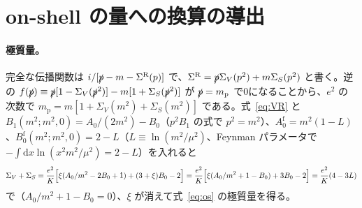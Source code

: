 \documentclass[a4paper,10pt]{ltjsarticle}
\newcommand{\dd}{\mathrm{d}}
\begin{document}
\section{on-shell の量への換算の導出}\label{app:os}

\paragraph{極質量。}完全な伝播関数は $i/[\slashed p-m-\Sigma^{\mathrm R}(p)]$ で、$\Sigma^{\mathrm R}=\slashed p\Sigma_V(p^2)+m\Sigma_S(p^2)$ と書く。逆の $f(\slashed p)\equiv\slashed p[1-\Sigma_V(\slashed p^2)]-m[1+\Sigma_S(\slashed p^2)]$ が $\slashed p=m_{\mathrm p}$ で0になることから、$e^2$ の次数で $m_{\mathrm p}=m[1+\Sigma_V(m^2)+\Sigma_S(m^2)]$ である。式~\eqref{eq:VR} と $B_1(m^2;m^2,0)=A_0/(2m^2)-B_0$（$p^2B_1$ の式で $p^2=m^2$）、$A_0^{\mathrm f}=m^2(1-L)$、$B_0^{\mathrm f}(m^2;m^2,0)=2-L$（$L\equiv\ln(m^2/\mu^2)$、Feynman パラメータで $-\int\dd x\ln(x^2m^2/\mu^2)=2-L$）を入れると
\begin{equation*}
\Sigma_V+\Sigma_S=\frac{e^2}{K}\Bigl[\xi(A_0/m^2-2B_0+1)+(3+\xi)B_0-2\Bigr]
=\frac{e^2}{K}\Bigl[\xi(A_0/m^2+1-B_0)+3B_0-2\Bigr]=\frac{e^2}{K}(4-3L)
\end{equation*}
で（$A_0/m^2+1-B_0=0$）、$\xi$ が消えて式~\eqref{eq:os} の極質量を得る。
\end{document}
